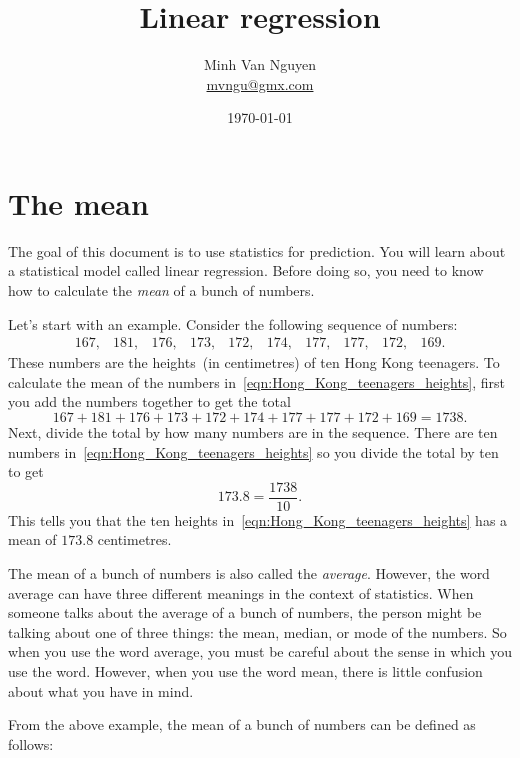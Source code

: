 \documentclass[a4paper,oneside,12pt]{article}
\begin{document}
\title{\Large\bf Linear regression}
\author{%
  Minh Van Nguyen \\
  \url{mvngu@gmx.com}
}
\date{\today}
\maketitle



\section{The mean}

The goal of this document is to use statistics for prediction.  You
will learn about a statistical model called linear regression.  Before
doing so, you need to know how to calculate the \emph{mean} of a bunch
of numbers.

Let's start with an example.  Consider the following sequence of
numbers:
\begin{equation}
\label{eqn:Hong_Kong_teenagers_heights}
\begin{matrix}
167, & 181, & 176, & 173, & 172, & 174, & 177, & 177, & 172, & 169.
\end{matrix}
\end{equation}
These numbers are the heights~(in centimetres) of ten Hong Kong
teenagers.  To calculate the mean of the numbers
in~\eqref{eqn:Hong_Kong_teenagers_heights}, first you add the numbers
together to get the total
\[
167 + 181 + 176 + 173 + 172 + 174 + 177 + 177 + 172 + 169
=
1738.
\]
Next, divide the total by how many numbers are in the sequence.  There
are ten numbers in~\eqref{eqn:Hong_Kong_teenagers_heights} so you
divide the total by ten to get
\[
173.8
=
\frac{1738}{10}.
\]
This tells you that the ten heights
in~\eqref{eqn:Hong_Kong_teenagers_heights} has a mean of $173.8$
centimetres.

The mean of a bunch of numbers is also called the \emph{average}.
However, the word average can have three different meanings in the
context of statistics.  When someone talks about the average of a
bunch of numbers, the person might be talking about one of three
things: the mean, median, or mode of the numbers.  So when you use the
word average, you must be careful about the sense in which you use the
word.  However, when you use the word mean, there is little confusion
about what you have in mind.

From the above example, the mean of a bunch of numbers can be defined
as follows:
\end{document}
